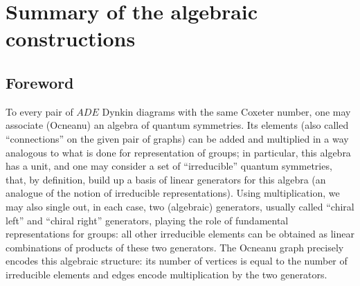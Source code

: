 \documentclass[a4paper,11pt]{article}
\let\sect=\section
\def\section{\newpage\sect}
\begin{document}
\section{Summary of the algebraic constructions}
\subsection{Foreword}
To every pair of $ADE$ Dynkin diagrams with the same Coxeter number,
one may associate (Ocneanu) an algebra of quantum symmetries. Its
elements (also called ``connections'' on the given pair of graphs) can
be added and multiplied in a way analogous to what is done for
representation of groups; in particular, this algebra has a unit, and one may
consider
a set of ``irreducible'' quantum symmetries, that, by definition, build up a
basis of linear generators for this algebra (an analogue of the notion
of irreducible representations). Using multiplication, we may also
single out, in each case, two (algebraic) generators, usually called
``chiral left'' and ``chiral right'' generators,  playing the role of
fundamental representations for groups: all other irreducible elements can be
obtained as linear combinations of products of these two
generators. The Ocneanu graph precisely encodes this algebraic
structure: its number of vertices is equal to the number
of irreducible elements and edges encode multiplication by the two
generators.
\end{document}
